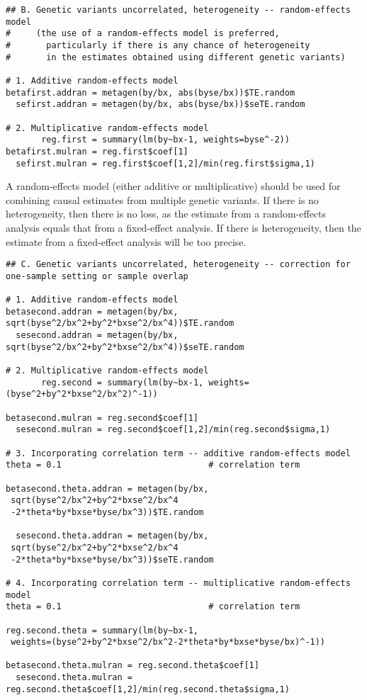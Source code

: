 \documentclass[a4paper,12pt]{article} %
\begin{document}
\begin{lstlisting}
## B. Genetic variants uncorrelated, heterogeneity -- random-effects model
#     (the use of a random-effects model is preferred,
#       particularly if there is any chance of heterogeneity
#       in the estimates obtained using different genetic variants)

# 1. Additive random-effects model
betafirst.addran = metagen(by/bx, abs(byse/bx))$TE.random
  sefirst.addran = metagen(by/bx, abs(byse/bx))$seTE.random

# 2. Multiplicative random-effects model
       reg.first = summary(lm(by~bx-1, weights=byse^-2))
betafirst.mulran = reg.first$coef[1]
  sefirst.mulran = reg.first$coef[1,2]/min(reg.first$sigma,1)
\end{lstlisting}

A random-effects model (either additive or multiplicative) should be used for combining causal estimates from multiple genetic variants. If there is no heterogeneity, then there is no loss, as the estimate from a random-effects analysis equals that from a fixed-effect analysis. If there is heterogeneity, then the estimate from a fixed-effect analysis will be too precise.

\begin{lstlisting}
## C. Genetic variants uncorrelated, heterogeneity -- correction for one-sample setting or sample overlap

# 1. Additive random-effects model
betasecond.addran = metagen(by/bx, sqrt(byse^2/bx^2+by^2*bxse^2/bx^4))$TE.random
  sesecond.addran = metagen(by/bx, sqrt(byse^2/bx^2+by^2*bxse^2/bx^4))$seTE.random

# 2. Multiplicative random-effects model
       reg.second = summary(lm(by~bx-1, weights=(byse^2+by^2*bxse^2/bx^2)^-1))

betasecond.mulran = reg.second$coef[1]
  sesecond.mulran = reg.second$coef[1,2]/min(reg.second$sigma,1)

# 3. Incorporating correlation term -- additive random-effects model
theta = 0.1                             # correlation term

betasecond.theta.addran = metagen(by/bx,
 sqrt(byse^2/bx^2+by^2*bxse^2/bx^4
 -2*theta*by*bxse*byse/bx^3))$TE.random

  sesecond.theta.addran = metagen(by/bx,
 sqrt(byse^2/bx^2+by^2*bxse^2/bx^4
 -2*theta*by*bxse*byse/bx^3))$seTE.random

# 4. Incorporating correlation term -- multiplicative random-effects model
theta = 0.1                             # correlation term

reg.second.theta = summary(lm(by~bx-1,
 weights=(byse^2+by^2*bxse^2/bx^2-2*theta*by*bxse*byse/bx)^-1))

betasecond.theta.mulran = reg.second.theta$coef[1]
  sesecond.theta.mulran = reg.second.theta$coef[1,2]/min(reg.second.theta$sigma,1)
\end{lstlisting}
\end{document}
